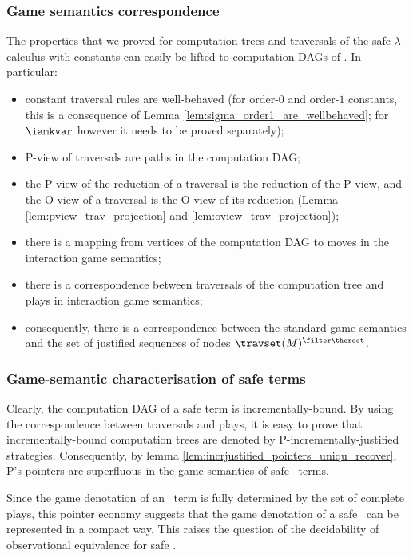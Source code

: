 \subsubsection{Game semantics correspondence}
The properties that we proved for computation trees and traversals
of the safe $\lambda$-calculus with constants can easily be lifted
to computation DAGs of \ialgol. In particular:
\begin{itemize}
\item constant traversal rules are well-behaved (for order-$0$ and order-$1$ constants, this is a consequence
of Lemma \ref{lem:sigma_order1_are_wellbehaved}; for $\iamkvar$
however it needs to be proved separately);
\item P-view of traversals are paths in the computation DAG;
\item the P-view of the reduction of a traversal is the reduction of the P-view,
and the O-view of a traversal is the O-view of its reduction
(Lemma \ref{lem:pview_trav_projection} and
\ref{lem:oview_trav_projection});
\item there is a mapping from vertices of the computation DAG to moves in the interaction game semantics;
\item there is a correspondence between traversals of the computation tree and plays in interaction game semantics;
\item consequently, there is a correspondence between the standard game semantics and
the set of justified sequences of nodes $\travset(M)^{\filter
\theroot}$.
\end{itemize}

\subsubsection{Game-semantic characterisation of safe terms}
Clearly, the computation DAG of a safe term is incrementally-bound.
By using the correspondence between traversals and plays, it is easy
to prove that incrementally-bound computation trees are denoted by
P-incrementally-justified strategies. Consequently, by lemma
\ref{lem:incrjustified_pointers_uniqu_recover}, P's pointers are superfluous in the
game semantics of safe \ialgol\ terms.

Since the game denotation of an \ialgol\ term is fully determined by
the set of complete plays, this pointer economy suggests that the
game denotation of a safe \ialgol\ can be represented in a compact
way. This raises the question of the decidability of observational
equivalence for safe \ialgol.



